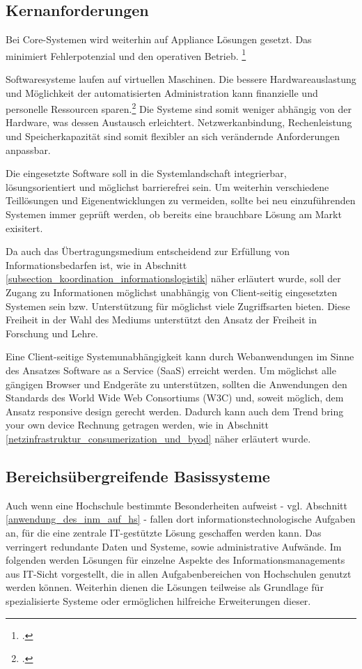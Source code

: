 \subsection{Kernanforderungen}
Bei Core-Systemen wird weiterhin auf Appliance Lösungen gesetzt. Das minimiert 
Fehlerpotenzial und den operativen Betrieb. \footcite{gunter_muller_interview}

Softwaresysteme laufen auf virtuellen Maschinen. Die bessere Hardwareauslastung 
und Möglichkeit der automatisierten Administration kann finanzielle und 
personelle Ressourcen sparen.\footcite[Vgl.][198]{baun_servervirtualisierung_2009}
Die Systeme sind somit weniger abhängig von der Hardware, was dessen Austausch 
erleichtert. Netzwerkanbindung, Rechenleistung und Speicherkapazität sind somit 
flexibler an sich verändernde Anforderungen anpassbar.

Die eingesetzte Software soll in die Systemlandschaft integrierbar, lösungsorientiert und 
möglichst barrierefrei sein. Um weiterhin verschiedene Teillösungen und Eigenentwicklungen 
zu vermeiden, sollte bei neu einzuführenden Systemen immer geprüft werden, ob bereits 
eine brauchbare Lösung am Markt exisitert.

Da auch das Übertragungsmedium entscheidend zur Erfüllung 
von Informationsbedarfen ist, wie in Abschnitt \ref{subsection_koordination_informationslogistik} 
näher erläutert wurde, soll der Zugang zu Informationen möglichst unabhängig von 
Client-seitig eingesetzten Systemen sein bzw. Unterstützung für möglichst viele 
Zugriffsarten bieten. Diese Freiheit in der Wahl des Mediums unterstützt den Ansatz der 
Freiheit in Forschung und Lehre.

Eine Client-seitige Systemunabhängigkeit kann durch Webanwendungen im Sinne des 
Ansatzes Software as a Service (SaaS) erreicht werden. Um möglichst alle gängigen Browser 
und Endgeräte zu unterstützen, sollten die Anwendungen den Standards des World Wide 
Web Consortiums (W3C) und, soweit möglich, dem Ansatz responsive design gerecht werden. 
Dadurch kann auch dem Trend bring your own device Rechnung getragen werden, wie in 
Abschnitt \ref{netzinfrastruktur_consumerization_und_byod} näher erläutert wurde.

\subsection{Bereichsübergreifende Basissysteme}
Auch wenn eine Hochschule bestimmte Besonderheiten aufweist - vgl. Abschnitt \ref{anwendung_des_inm_auf_hs} - 
fallen dort informationstechnologische Aufgaben an, für die eine zentrale IT-gestützte 
Lösung geschaffen werden kann. Das verringert redundante Daten und Systeme, sowie 
administrative Aufwände. Im folgenden werden Lösungen für einzelne Aspekte des 
Informationsmanagements aus IT-Sicht vorgestellt, die in allen Aufgabenbereichen von 
Hochschulen genutzt werden können. Weiterhin dienen die Lösungen teilweise als Grundlage 
für spezialisierte Systeme oder ermöglichen hilfreiche Erweiterungen dieser.

